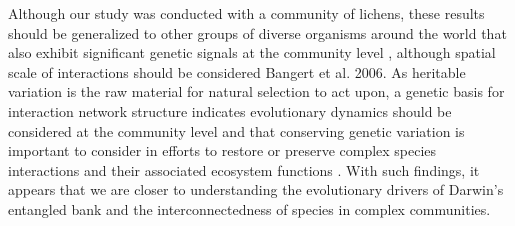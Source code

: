 \documentclass[9pt,twocolumn,twoside,lineno]{pnas-new}
\begin{document}
Although our study was conducted with a community of lichens, these
results should be generalized to other groups of diverse organisms
around the world that also exhibit significant genetic signals at the
community level \cite{Rowntree2011, Whitham2012}, although spatial
scale of interactions should be considered \cite{Zook2010} Bangert et
al. 2006. As heritable variation is the raw material for natural
selection to act upon, a genetic basis for interaction network
structure indicates evolutionary dynamics should be considered at the
community level and that conserving genetic variation is important to
consider in efforts to restore or preserve complex species
interactions and their associated ecosystem functions
\cite{Evans2013}.  With such findings, it appears that we are closer
to understanding the evolutionary drivers of Darwin's entangled bank
and the interconnectedness of species in complex communities.



\showacknow{} %


\end{document}
